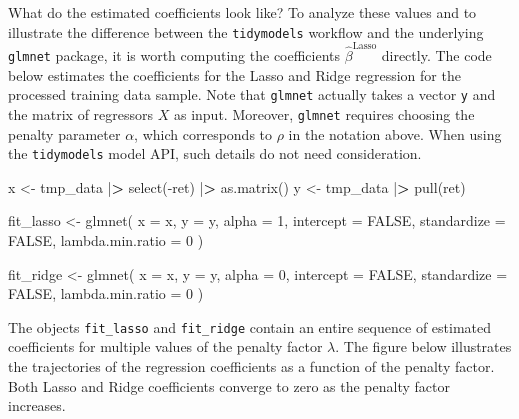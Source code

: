 \documentclass[
]{book}
\newenvironment{Shaded}{\begin{snugshade}}{\end{snugshade}}
\newcommand{\AttributeTok}[1]{\textcolor[rgb]{0.61,0.61,0.61}{#1}}
\newcommand{\ConstantTok}[1]{\textcolor[rgb]{0,0,0}{#1}}
\newcommand{\DecValTok}[1]{\textcolor[rgb]{0.06,0.06,0.06}{#1}}
\newcommand{\ErrorTok}[1]{\textcolor[rgb]{0.14,0.14,0.14}{\textbf{#1}}}
\newcommand{\FunctionTok}[1]{\textcolor[rgb]{0,0,0}{#1}}
\newcommand{\NormalTok}[1]{#1}
\newcommand{\OtherTok}[1]{\textcolor[rgb]{0.37,0.37,0.37}{#1}}
\newcommand{\SpecialCharTok}[1]{\textcolor[rgb]{0,0,0}{#1}}
\begin{document}
What do the estimated coefficients look like? To analyze these values and to illustrate the difference between the \texttt{tidymodels} workflow and the underlying \texttt{glmnet} package, it is worth computing the coefficients \(\hat\beta^\text{Lasso}\) directly. The code below estimates the coefficients for the Lasso and Ridge regression for the processed training data sample. Note that \texttt{glmnet} actually takes a vector \texttt{y} and the matrix of regressors \(X\) as input. Moreover, \texttt{glmnet} requires choosing the penalty parameter \(\alpha\), which corresponds to \(\rho\) in the notation above. When using the \texttt{tidymodels} model API, such details do not need consideration.

\begin{Shaded}
\begin{Highlighting}[]
\NormalTok{x }\OtherTok{\textless{}{-}}\NormalTok{ tmp\_data }\SpecialCharTok{|}\ErrorTok{\textgreater{}}
  \FunctionTok{select}\NormalTok{(}\SpecialCharTok{{-}}\NormalTok{ret) }\SpecialCharTok{|}\ErrorTok{\textgreater{}}
  \FunctionTok{as.matrix}\NormalTok{()}
\NormalTok{y }\OtherTok{\textless{}{-}}\NormalTok{ tmp\_data }\SpecialCharTok{|}\ErrorTok{\textgreater{}} \FunctionTok{pull}\NormalTok{(ret)}

\NormalTok{fit\_lasso }\OtherTok{\textless{}{-}} \FunctionTok{glmnet}\NormalTok{(}
  \AttributeTok{x =}\NormalTok{ x,}
  \AttributeTok{y =}\NormalTok{ y,}
  \AttributeTok{alpha =} \DecValTok{1}\NormalTok{,}
  \AttributeTok{intercept =} \ConstantTok{FALSE}\NormalTok{,}
  \AttributeTok{standardize =} \ConstantTok{FALSE}\NormalTok{,}
  \AttributeTok{lambda.min.ratio =} \DecValTok{0}
\NormalTok{)}

\NormalTok{fit\_ridge }\OtherTok{\textless{}{-}} \FunctionTok{glmnet}\NormalTok{(}
  \AttributeTok{x =}\NormalTok{ x,}
  \AttributeTok{y =}\NormalTok{ y,}
  \AttributeTok{alpha =} \DecValTok{0}\NormalTok{,}
  \AttributeTok{intercept =} \ConstantTok{FALSE}\NormalTok{,}
  \AttributeTok{standardize =} \ConstantTok{FALSE}\NormalTok{,}
  \AttributeTok{lambda.min.ratio =} \DecValTok{0}
\NormalTok{)}
\end{Highlighting}
\end{Shaded}

The objects \texttt{fit\_lasso} and \texttt{fit\_ridge} contain an entire sequence of estimated coefficients for multiple values of the penalty factor \(\lambda\). The figure below illustrates the trajectories of the regression coefficients as a function of the penalty factor. Both Lasso and Ridge coefficients converge to zero as the penalty factor increases.
\end{document}
